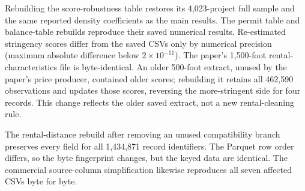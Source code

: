 Rebuilding the score-robustness table restores its 4,023-project full sample
and the same reported density coefficients as the main results. The permit
table and balance-table rebuilds reproduce their saved numerical results.
Re-estimated stringency scores differ from the saved CSVs only by numerical
precision (maximum absolute difference below $2\times10^{-11}$). The paper's
1,500-foot rental-characteristics file is byte-identical. An older 500-foot
extract, unused by the paper's price producer, contained older scores; rebuilding
it retains all 462,590 observations and updates those scores, reversing the
more-stringent side for four records. This change reflects the older saved
extract, not a new rental-cleaning rule.

The rental-distance rebuild after removing an unused compatibility branch
preserves every field for all 1,434,871 record identifiers. The Parquet row order
differs, so the byte fingerprint changes, but the keyed data are identical.
The commercial source-column simplification likewise reproduces all seven
affected CSVs byte for byte.
